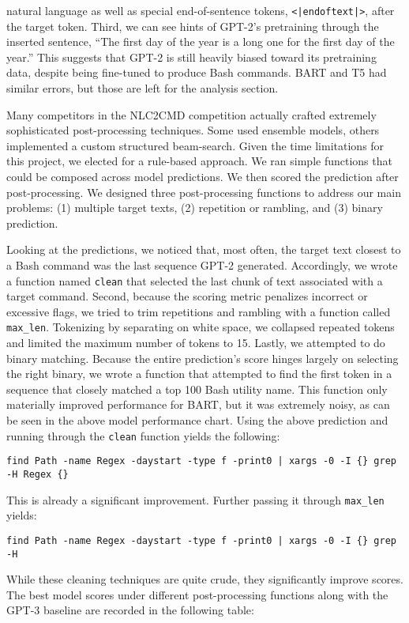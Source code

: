 \documentclass{article}
\begin{document}
natural language as well as special end-of-sentence tokens,
\texttt{<|endoftext|>}, after the target token. Third, we can see hints of
GPT-2's pretraining through the inserted sentence, ``The first day of the year is
a long one for the first day of the year.'' This suggests that GPT-2 is still
heavily biased toward its pretraining data, despite being fine-tuned to produce
Bash commands. BART and T5 had similar errors, but those are left for the
analysis section.
\par
Many competitors in the NLC2CMD competition actually crafted extremely
sophisticated post-processing techniques. Some used ensemble models, others
implemented a custom structured beam-search. Given the time limitations for
this project, we elected for a rule-based approach. We ran simple functions
that could be composed across model predictions. We then scored the
prediction after post-processing. We designed three post-processing functions to
address our main problems: (1) multiple target texts, (2) repetition or
rambling, and (3) binary prediction.
\par
Looking at the predictions, we noticed that, most often, the target text
closest to a Bash command was the last sequence GPT-2 generated. Accordingly, we
wrote a function named \texttt{clean} that selected the last chunk of text
associated with a target command. Second, because the scoring metric penalizes
incorrect or excessive flags, we tried to trim repetitions and rambling with a
function called \texttt{max\_len}. Tokenizing by separating on white space, we
collapsed repeated tokens and limited the maximum number of tokens to 15.
Lastly, we attempted to do binary matching. Because the entire prediction's
score hinges largely on selecting the right binary, we wrote a function that
attempted to find the first token in a sequence that closely matched a top 100
Bash utility name. This function only materially improved performance for BART,
but it was extremely noisy, as can be seen in the above model performance chart.
Using the above prediction and running through the \texttt{clean} function yields the
following:
\begin{verbatim}
find Path -name Regex -daystart -type f -print0 | xargs -0 -I {} grep -H Regex {}
\end{verbatim}
This is already a significant improvement. Further passing it through
\texttt{max\_len} yields:
\begin{verbatim}
find Path -name Regex -daystart -type f -print0 | xargs -0 -I {} grep -H
\end{verbatim}
While these cleaning techniques are quite crude, they significantly improve
scores. The best model scores under different post-processing functions along
with the GPT-3 baseline are recorded in the following table:
\end{document}
